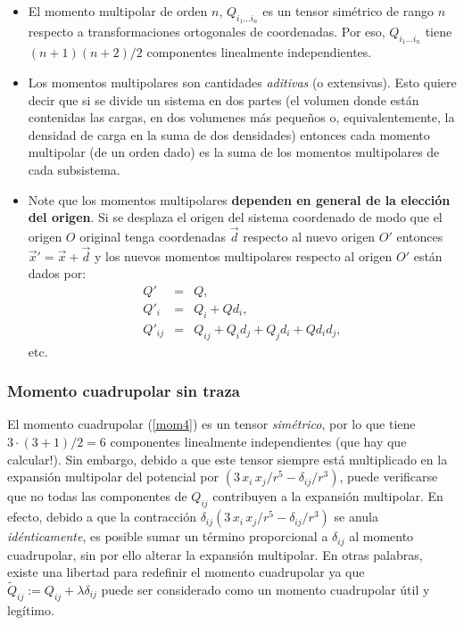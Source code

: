 \begin{itemize} 
\item El momento multipolar de orden $n$, $Q_{i_1\dots i_n}$ es un tensor simétrico de rango $n$ respecto a transformaciones ortogonales de coordenadas. Por eso, $Q_{i_1\dots i_n}$ tiene $(n+1)(n+2)/2$ componentes linealmente independientes.

\item Los momentos multipolares son cantidades \textit{aditivas} (o extensivas). Esto quiere decir que si se divide un sistema en dos partes (el volumen donde están contenidas las cargas, en dos volumenes más peque\~nos o, equivalentemente, la densidad de carga en la suma de dos densidades) entonces cada momento multipolar (de un orden dado) es la suma de los momentos multipolares de cada subsistema.

\item Note que los momentos multipolares \textbf{dependen en general de la
elección del origen}. Si se desplaza el origen del sistema coordenado de modo que el origen $O$ original tenga coordenadas $\vec{d}$ respecto al nuevo origen $O'$ entonces
$\vec{x}'=\vec{x}+\vec{d}$ y los nuevos momentos multipolares respecto al origen $O'$ están dados por:
\begin{eqnarray}
 Q'&=&Q,\\
Q'_i&=&Q_i+Qd_i,\\
Q'_{ij}&=&Q_{ij}+Q_id_j+Q_jd_i+Qd_id_j,
\end{eqnarray}
etc.
\end{itemize}

\subsubsection{Momento cuadrupolar sin traza}\label{MCSM}
El momento cuadrupolar (\ref{mom4}) es un tensor \textit{simétrico}, por lo
que tiene ${3\cdot (3+1)}/{2}=6$ componentes linealmente independientes (que
hay que calcular!). Sin embargo, debido a que este tensor siempre está
multiplicado en la expansión multipolar del potencial por
$\left({3\,x_i\,x_j}/{r^5}-{\delta_{ij}}/{r^3}\right)$, puede
verificarse que no todas las componentes de $Q_{ij}$ contribuyen a la
expansión multipolar. En efecto, debido a que la contracción
$\delta_{ij}\left({3\,x_i\,x_j}/{r^5}-{\delta_{ij}}/{r^3}\right)$ se
anula \textit{idénticamente}, es posible sumar un término proporcional a
$\delta_{ij}$ al momento cuadrupolar, sin por ello alterar la expansión
multipolar. En otras palabras, existe una libertad para redefinir el momento
cuadrupolar ya que $\tilde{Q}_{ij}:=Q_{ij}+\lambda\delta_{ij}$ puede ser
considerado como un momento cuadrupolar útil y legítimo. 

